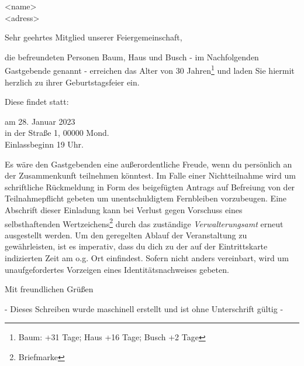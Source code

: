 \documentclass[
    sender,
    paper=a4,
    version=last,
    fontsize=11pt,
    DIV=13,
    BCOR=0mm]{scrlttr2}
\begin{document}


\begin{letter}{
    <name>\\
    <adress>\\
    }
    
\opening{Sehr geehrtes Mitglied unserer Feiergemeinschaft,}

die befreundeten Personen Baum, Haus und Busch - im Nachfolgenden Gastgebende genannt 
- erreichen das Alter von 30 Jahren\footnote{Baum: +31 Tage; Haus +16 Tage; Busch +2 Tage} und laden Sie hiermit herzlich zu ihrer Geburtstagsfeier ein.

Diese findet statt:

am 28. Januar 2023 \\
in der Straße 1, 00000 Mond. \\
Einlassbeginn 19 Uhr.

Es wäre den Gastgebenden eine außerordentliche Freude, wenn du persönlich an der Zusammenkunft teilnehmen könntest. Im Falle einer Nichtteilnahme wird um schriftliche Rückmeldung in Form des beigefügten Antrags auf Befreiung von der Teilnahmepflicht gebeten um unentschuldigtem Fernbleiben vorzubeugen.
Eine Abschrift dieser Einladung kann bei Verlust gegen Vorschuss eines selbsthaftenden Wertzeichens\footnote{Briefmarke} durch das zuständige \textit{Verwalterungsamt} erneut ausgestellt werden.
Um den geregelten Ablauf der Veranstaltung zu gewährleisten, ist es imperativ, dass du dich zu der auf der Eintrittskarte indizierten Zeit am o.g. Ort einfindest. Sofern nicht anders vereinbart, wird um unaufgefordertes Vorzeigen eines Identitätsnachweises gebeten.

\closing{Mit freundlichen Grüßen} %
\begin{center}
    - Dieses Schreiben wurde maschinell erstellt und ist ohne Unterschrift gültig -
\end{center}
\vspace*{\fill}

\end{letter}
\end{document}
